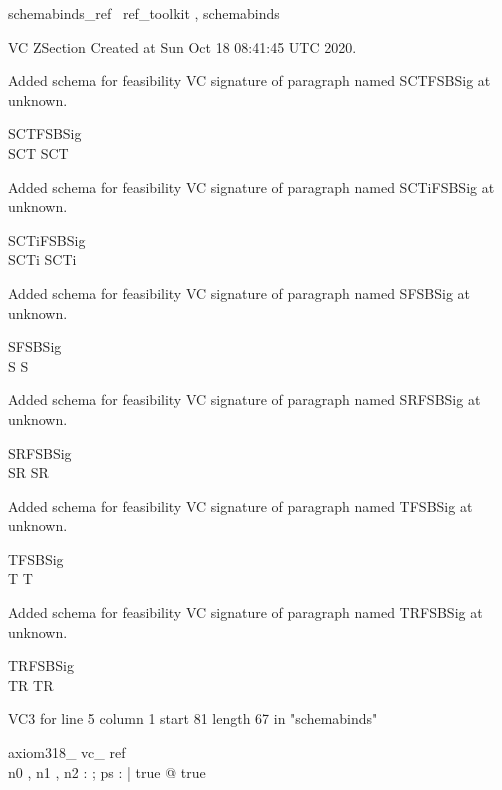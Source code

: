 \documentclass{article}
\begin{document}

\begin{zsection}	 \SECTION schemabinds\_ref \parents~ref\_toolkit , schemabinds
\end{zsection}

VC ZSection Created at Sun Oct 18 08:41:45 UTC 2020.


Added schema for feasibility VC signature of paragraph named SCTFSBSig at unknown.
\begin{schema}{SCTFSBSig}
\\
 SCT 
\where
 SCT
\end{schema}


Added schema for feasibility VC signature of paragraph named SCTiFSBSig at unknown.
\begin{schema}{SCTiFSBSig}
\\
 SCTi 
\where
 SCTi
\end{schema}


Added schema for feasibility VC signature of paragraph named SFSBSig at unknown.
\begin{schema}{SFSBSig}
\\
 S 
\where
 S
\end{schema}


Added schema for feasibility VC signature of paragraph named SRFSBSig at unknown.
\begin{schema}{SRFSBSig}
\\
 SR 
\where
 SR
\end{schema}


Added schema for feasibility VC signature of paragraph named TFSBSig at unknown.
\begin{schema}{TFSBSig}
\\
 T 
\where
 T
\end{schema}


Added schema for feasibility VC signature of paragraph named TRFSBSig at unknown.
\begin{schema}{TRFSBSig}
\\
 TR 
\where
 TR
\end{schema}

VC3 for line 5 column 1 start 81 length 67 in "schemabinds"
\begin{theorem}{ axiom318\_ vc\_ ref}\\
 \exists n0 , n1 , n2 : \nat ; ps : \power \nat | true @ true \\

\end{theorem}
\end{document}
